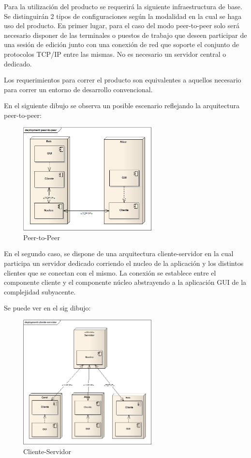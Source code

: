 \documentclass[12pt,a4paper]{article}
\begin{document}
Para la utilización del producto se requerirá la siguiente infraestructura de base.
Se distinguirán 2 tipos de configuraciones según la modalidad en la cual se haga uso del producto.
En primer lugar, para el caso del modo peer-to-peer solo será necesario disponer de las terminales o puestos de trabajo que deseen participar de una sesión de edición junto con una conexión de red que soporte el conjunto de protocolos TCP/IP entre las mismas. No es necesario un servidor central o dedicado.

Los requerimientos para correr el producto son equivalentes a aquellos necesario para correr un entorno de desarrollo convencional.

En el siguiente dibujo se observa un posible escenario reflejando la arquitectura peer-to-peer:


	\begin{figure}[H]
		\begin{center}
			\includegraphics[width=7cm]{peer-to-peer.png}
			\caption{\label{peer} Peer-to-Peer }
		\end{center}
	\end{figure}



En el segundo caso, se dispone de una arquitectura cliente-servidor en la cual participa un servidor dedicado corriendo el nucleo de la aplicación y los distintos clientes que se conectan con el mismo. La conexión se establece entre el componente cliente y el componente núcleo abstrayendo a la aplicación GUI de la complejidad subyacente.

Se puede ver en el sig dibujo:

	\begin{figure}[H]
		\begin{center}
			\includegraphics[width=7cm]{cliente-servidor.png}
			\caption{\label{server-client} Cliente-Servidor }
		\end{center}
	\end{figure}
\end{document}
